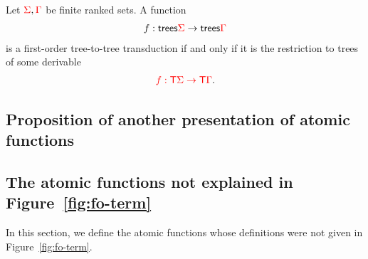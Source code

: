




\begin{theorem}\label{thm:main}
    Let ${\color{red}{\Sigma}},{\color{red}{\Gamma}}$ be finite ranked sets. A function 
    \begin{align*}
        f : \mathsf {trees} {\color{red}{\Sigma}} \to \mathsf {trees} {\color{red}{\Gamma}}
    \end{align*}
    is a first-order tree-to-tree transduction if and only if it is the restriction to trees of some derivable
    \begin{align*}
        {\color{red}{f : {\color{red}{\mathsf T}}\Sigma \to {\color{red}{\mathsf T}}\Gamma}}.
    \end{align*}
    
\end{theorem}

\subsection{Proposition of another presentation of atomic functions}


\subsection{The atomic functions not explained in Figure~\ref{fig:fo-term}}
\label{sec:atomic-and-combinators}
In this section, we define the atomic functions whose definitions were not given in Figure~\ref{fig:fo-term}. 




